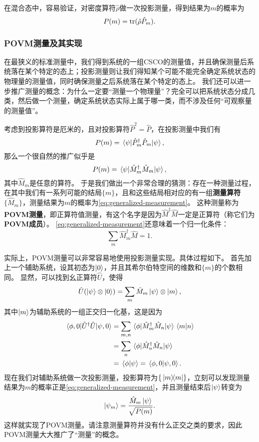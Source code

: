 \documentclass[UTF8, a4paper]{ctexart}
\begin{document}
在混合态中，容易验证，对密度算符$\hat{\rho}$做一次投影测量，得到结果为$m$的概率为
\begin{equation}
    P(m) = \trace(\hat{\rho} \hat{P}_m).
\end{equation}

\subsubsection{POVM测量及其实现}

在最狭义的标准测量中，我们得到系统的一组CSCO的测量值，并且确保测量后系统落在某个特定的态上；投影测量则让我们得知某个可能不能完全确定系统状态的物理量的测量值，同时确保测量之后系统落在某个特定的态上。
我们还可以进一步推广测量的概念：为什么一定要“测量一个物理量”？完全可以把系统状态分成几类，然后做一个测量，确定系统状态实际上属于哪一类，而不涉及任何“可观察量的测量值”。

考虑到投影算符是厄米的，且对投影算符$\hat{P}^2 = \hat{P}$，在投影测量中我们有
\[
    P(m) = \mel*{\psi}{\hat{P}_m^\dagger \hat{P}_m}{\psi},
\]
那么一个很自然的推广似乎是
\begin{equation}
    P(m) = \mel*{\psi}{\hat{M}_m^\dagger \hat{M}_m}{\psi},
    \label{eq:generalized-measurement}
\end{equation}
其中$\hat{M}_m$是任意的算符。
于是我们做出一个非常合理的猜测：存在一种测量过程，在其中我们有一系列可能的结局$\{m\}$，且和这些结局相对应的有一组\textbf{测量算符}$\{\hat{M}_m\}$，测量结果为$m$的概率为\eqref{eq:generalized-measurement}。
这种测量称为\textbf{POVM测量}，即正算符值测量，有这个名字是因为$\hat{M}^\dagger \hat{M}$一定是正算符（称它们为\textbf{POVM成员}）。
\eqref{eq:generalized-measurement}还意味着一个归一化条件：
\begin{equation}
    \sum_m \hat{M}^\dagger_m \hat{M} = 1.
\end{equation}

实际上，POVM测量可以非常容易地使用投影测量实现。具体过程如下。
首先加上一个辅助系统，设其初态为$\ket{0}$，并且其希尔伯特空间的维数和$\{m\}$的个数相同。
显然，可以找到幺正算符$\hat{U}$，使得
\begin{equation}
    \hat{U} (\ket{\psi} \otimes \ket{0}) = \sum_m \hat{M}_m \ket{\psi} \otimes \ket{m},
\end{equation}
其中$\ket{m}$为辅助系统的一组正交归一化基，这是因为
\[
    \begin{aligned}
        \mel*{\phi, 0}{\hat{U}^\dagger \hat{U}}{\psi, 0} &= \sum_{m, n} \mel*{\phi}{\hat{M}^\dagger_m \hat{M}_n}{\psi} \braket*{m}{n} \\
        &= \sum_n \mel*{\phi}{\hat{M}^\dagger_n \hat{M}_n}{\psi} \\
        &= \braket*{\phi}{\psi} = \braket*{\phi, 0}{\psi, 0}.
    \end{aligned}
\]
现在我们对辅助系统做一次投影测量，投影算符为$\{\dyad*{m}{m}\}$，立刻可以发现测量结果为$m$的概率正是\eqref{eq:generalized-measurement}，并且测量结束后$\ket{\psi}$转变为
\begin{equation}
    \ket{\psi_m} = \frac{\hat{M}_m \ket{\psi}}{\sqrt{P(m)}}.
\end{equation}
这样就实现了POVM测量。请注意测量算符并没有什么正交之类的要求，因此POVM测量大大推广了“测量”的概念。
\end{document}
